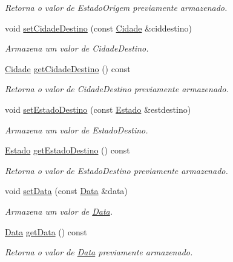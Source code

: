 \begin{DoxyCompactItemize}
\begin{DoxyCompactList}\small\item\em Retorna o valor de Estado\+Origem previamente armazenado. \end{DoxyCompactList}\item 
void \hyperlink{classshibarides_1_1Carona_a679af6917e6369980427717f986b139a}{set\+Cidade\+Destino} (const \hyperlink{classshibarides_1_1Cidade}{Cidade} \&ciddestino)
\begin{DoxyCompactList}\small\item\em Armazena um valor de Cidade\+Destino. \end{DoxyCompactList}\item 
\hyperlink{classshibarides_1_1Cidade}{Cidade} \hyperlink{classshibarides_1_1Carona_a9db3d8d18f6b1395770b93ec79da5406}{get\+Cidade\+Destino} () const 
\begin{DoxyCompactList}\small\item\em Retorna o valor de Cidade\+Destino previamente armazenado. \end{DoxyCompactList}\item 
void \hyperlink{classshibarides_1_1Carona_ad45ec8a30c65465ac957c23f2524f2d2}{set\+Estado\+Destino} (const \hyperlink{classshibarides_1_1Estado}{Estado} \&estdestino)
\begin{DoxyCompactList}\small\item\em Armazena um valor de Estado\+Destino. \end{DoxyCompactList}\item 
\hyperlink{classshibarides_1_1Estado}{Estado} \hyperlink{classshibarides_1_1Carona_a6bf4e3a027d39582564fac6691a4ebaa}{get\+Estado\+Destino} () const 
\begin{DoxyCompactList}\small\item\em Retorna o valor de Estado\+Destino previamente armazenado. \end{DoxyCompactList}\item 
void \hyperlink{classshibarides_1_1Carona_a41ec8487483226c682dc23ea0b70dc1f}{set\+Data} (const \hyperlink{classshibarides_1_1Data}{Data} \&data)
\begin{DoxyCompactList}\small\item\em Armazena um valor de \hyperlink{classshibarides_1_1Data}{Data}. \end{DoxyCompactList}\item 
\hyperlink{classshibarides_1_1Data}{Data} \hyperlink{classshibarides_1_1Carona_a107f7a86aa5208f31982aa19d27643b6}{get\+Data} () const 
\begin{DoxyCompactList}\small\item\em Retorna o valor de \hyperlink{classshibarides_1_1Data}{Data} previamente armazenado. \end{DoxyCompactList}\item 

\end{DoxyCompactItemize}
